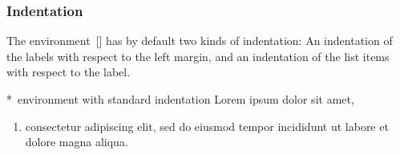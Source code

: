 \subsubsection{Indentation}

The environment~[\envname] has by default two kinds of indentation:
An indentation of the labels with respect to the left margin, and an indentation of the list items with respect to the label.
\begin{showlatex}*{~environment with standard indentation}
Lorem ipsum dolor sit amet,
\begin{enumerate}
  \item
  consectetur adipiscing elit, sed do eiusmod tempor incididunt ut labore et dolore magna aliqua.
\end{enumerate}
\end{showlatex}

